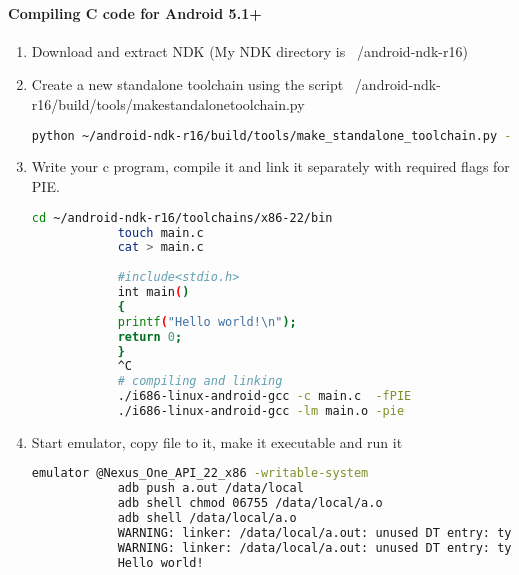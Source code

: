 \documentclass[../main.tex]{subfile}
\begin{document}
\begin{appendices}
		\paragraph{Compiling C code for Android 5.1+}
		\begin{enumerate}
			\item Download and extract NDK (My NDK directory is ~/android-ndk-r16)
			\item Create a new standalone toolchain using the script ~/android-ndk-r16/build/tools/make\textunderscore standalone\textunderscore toolchain.py
			\begin{lstlisting}[language=bash, numbers=none]
			python ~/android-ndk-r16/build/tools/make_standalone_toolchain.py --arch x86 --api 22 --install-dir ~/android-ndk-r16/toolchains/x86-22
			\end{lstlisting}
			\item Write your c program, compile it and link it separately with required flags for PIE.
			\begin{lstlisting}[language=bash]
			cd ~/android-ndk-r16/toolchains/x86-22/bin
			touch main.c
			cat > main.c
			
			#include<stdio.h>
			int main()
			{
			printf("Hello world!\n");
			return 0;
			}
			^C
			# compiling and linking
			./i686-linux-android-gcc -c main.c  -fPIE
			./i686-linux-android-gcc -lm main.o -pie
			\end{lstlisting}
			\item Start emulator, copy file to it, make it executable and run it
			\begin{lstlisting}[language=bash, firstnumber=15]
			emulator @Nexus_One_API_22_x86 -writable-system
			adb push a.out /data/local
			adb shell chmod 06755 /data/local/a.o
			adb shell /data/local/a.o
			WARNING: linker: /data/local/a.out: unused DT entry: type 0x6ffffffe arg 0x32c
			WARNING: linker: /data/local/a.out: unused DT entry: type 0x6fffffff arg 0x1
			Hello world!
			\end{lstlisting}
		\end{enumerate}
	

\end{appendices}
\end{document}
